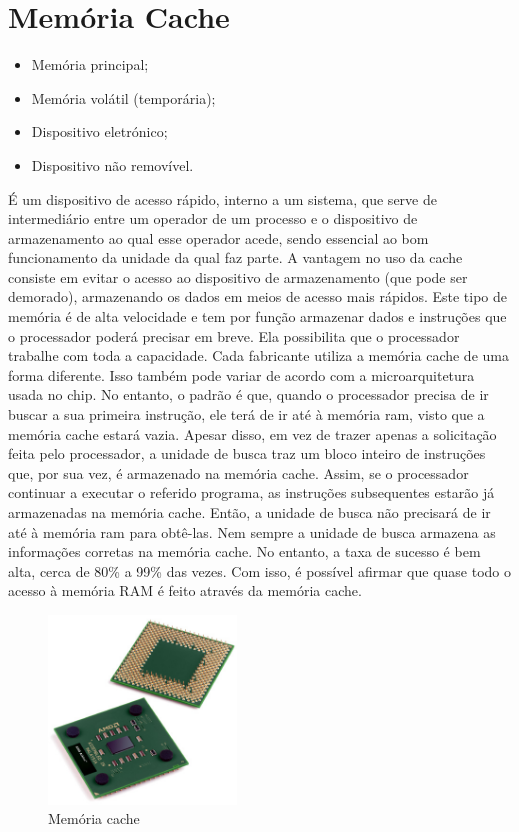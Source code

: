 \documentclass[a4paper]{report}
\begin{document}
\newpage

\section{Memória Cache}
\label{sect.cache}

\begin{itemize}
\item Memória principal;
\item Memória volátil (temporária);
\item Dispositivo eletrónico;
\item Dispositivo não removível.
\end{itemize}

É um dispositivo de acesso rápido, interno a um sistema, que serve de intermediário entre um operador de um processo e o dispositivo de armazenamento ao qual esse operador acede, sendo essencial ao bom funcionamento da unidade da qual faz parte.
A vantagem no uso da cache consiste em evitar o acesso ao dispositivo de armazenamento (que pode ser demorado), armazenando os dados em meios de acesso mais rápidos.
Este tipo de memória é de alta velocidade e tem por função armazenar dados e instruções que o processador poderá precisar em breve. Ela possibilita que o processador trabalhe com toda a capacidade.
Cada fabricante utiliza a memória cache de uma forma diferente. Isso também pode variar de acordo com a microarquitetura usada no chip. No entanto, o padrão é que, quando o processador precisa de ir buscar a sua primeira instrução, ele terá de ir até à memória \ac{ram}, visto que a memória cache estará vazia.
Apesar disso, em vez de trazer apenas a solicitação feita pelo processador, a unidade de busca traz um bloco inteiro de instruções que, por sua vez, é armazenado na memória cache. Assim, se o processador continuar a executar o referido programa, as instruções subsequentes estarão já armazenadas na memória cache. Então, a unidade de busca não precisará de ir até à memória \ac{ram} para obtê-las.
Nem sempre a unidade de busca armazena as informações corretas na memória cache. No entanto, a taxa de sucesso é bem alta, cerca de 80\% a 99\% das vezes. Com isso, é possível afirmar que quase todo o acesso à memória RAM é feito através da memória cache.

\begin{figure}[H]
\center
\includegraphics[width=5cm]{Imagens/cache.JPG}
\caption{Memória cache}
\end{figure}
\end{document}
